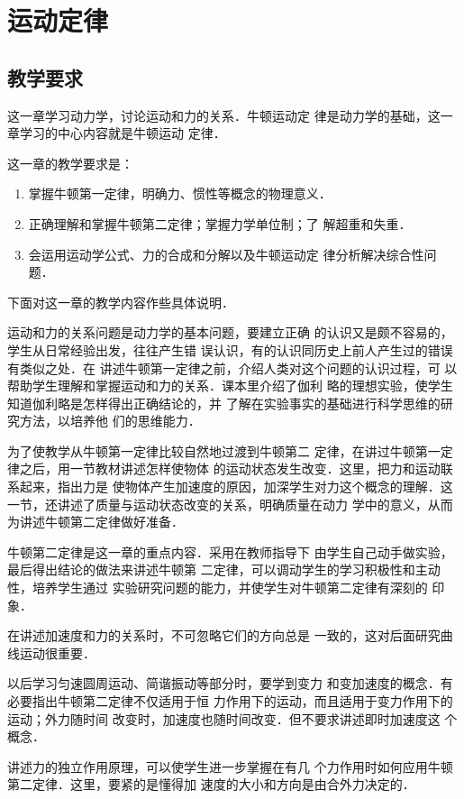 
\chapter{运动定律}\minitoc[n]
\section{教学要求}
这一章学习动力学，讨论运动和力的关系．牛顿运动定
律是动力学的基础，这一章学习的中心内容就是牛顿运动
定律．

这一章的教学要求是：
\begin{enumerate}

\item 掌握牛顿第一定律，明确力、惯性等概念的物理意义．
\item 正确理解和掌握牛顿第二定律；掌握力学单位制；了
解超重和失重．
\item 会运用运动学公式、力的合成和分解以及牛顿运动定
律分析解决综合性问题．
\end{enumerate}

下面对这一章的教学内容作些具体说明．

运动和力的关系问题是动力学的基本问题，要建立正确
的认识又是颇不容易的，学生从日常经验出发，往往产生错
误认识，有的认识同历史上前人产生过的错误有类似之处．在
讲述牛顿第一定律之前，介绍人类对这个问题的认识过程，可
以帮助学生理解和掌握运动和力的关系．课本里介绍了伽利
略的理想实验，使学生知道伽利略是怎样得出正确结论的，并
了解在实验事实的基础进行科学思维的研究方法，以培养他
们的思维能力．

为了使教学从牛顿第一定律比较自然地过渡到牛顿第二
定律，在讲过牛顿第一定律之后，用一节教材讲述怎样使物体
的运动状态发生改变．这里，把力和运动联系起来，指出力是
使物体产生加速度的原因，加深学生对力这个概念的理解．这
一节，还讲述了质量与运动状态改变的关系，明确质量在动力
学中的意义，从而为讲述牛顿第二定律做好准备．

牛顿第二定律是这一章的重点内容．采用在教师指导下
由学生自己动手做实验，最后得出结论的做法来讲述牛顿第
二定律，可以调动学生的学习积极性和主动性，培养学生通过
实验研究问题的能力，并使学生对牛顿第二定律有深刻的
印象．

在讲述加速度和力的关系时，不可忽略它们的方向总是
一致的，这对后面研究曲线运动很重要．

以后学习匀速圆周运动、简谐振动等部分时，要学到变力
和变加速度的概念．有必要指出牛顿第二定律不仅适用于恒
力作用下的运动，而且适用于变力作用下的运动；外力随时间
改变时，加速度也随时间改变．但不要求讲述即时加速度这
个概念．

讲述力的独立作用原理，可以使学生进一步掌握在有几
个力作用时如何应用牛顿第二定律．这里，要紧的是懂得加
速度的大小和方向是由合外力决定的．

